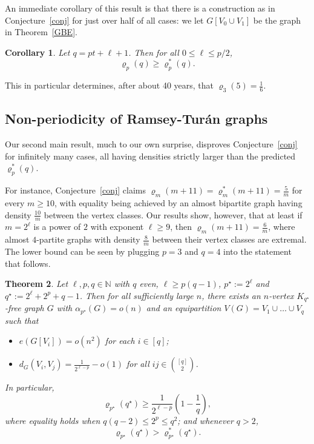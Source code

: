 \documentclass[10pt,a4paper]{article}
\newtheorem{theorem}{Theorem}[section]
\newtheorem{corollary}[theorem]{Corollary}
\theoremstyle{definition}
\begin{document}
An immediate corollary of this result is that there is a construction as in Conjecture~\ref{conj} for just over half of all cases: we let $G[V_0 \cup V_1]$ be the graph in Theorem~\ref{GBE}.


\begin{corollary}\label{cor}
	Let $q = pt+\ell+1$. Then for all $0 \leq \ell \leq p/2$, 
	$$\varrho_p(q) \geq \varrho_p^*(q).$$
\end{corollary}

This in particular determines, after about 40 years, that $\varrho_3(5)=\frac{1}{6}$.

\subsection{Non-periodicity of Ramsey-Tur\'an graphs}
Our second main result, much to our own surprise, disproves Conjecture~\ref{conj} for infinitely many cases, all having densities strictly larger than the predicted $\varrho_p^*(q)$. 

For instance, Conjecture~\ref{conj} claims $\varrho_m(m+11)=\varrho_m^*(m+11)=\frac{5}{m}$
for every $m \geq 10$, with equality being achieved by an almost bipartite graph having density $\frac{10}{m}$ between the vertex classes. Our results show, however, that at least if $m=2^\ell$ is a power of $2$ with exponent $\ell \geq 9$, then $\varrho_m(m+11)=\frac{6}{m}$, where almost $4$-partite graphs with density $\frac{8}{m}$ between their vertex classes are extremal. The lower bound can be seen by plugging $p=3$ and $q=4$ into the statement that follows.


\begin{theorem}\label{thm-2tri-exact}
	Let $\ell,p,q\in\mathbb{N}$ with $q$ even, $\ell \geq p(q-1)$, $p^{\star}:=2^\ell$ and $q^{\star}:=2^\ell+2^p+q-1$. Then for all sufficiently large $n$, there exists an $n$-vertex $K_{q^{\star}}$-free graph $G$ with $\alpha_{p^{\star}}(G)=o(n)$ and an  equipartition $V(G)=V_1\cup\ldots\cup V_q$ such that
	\begin{itemize}
		\item $e(G[V_i])=o(n^2)$ for each $i\in[q]$;
		
		\item $d_G(V_i,V_j)=\frac{1}{2^{\ell-p}}-o(1)$ for all $ij\in{[q]\choose 2}$.
	\end{itemize}
	In particular, 
	\begin{equation}\label{eq:multi-lower}
		\varrho_{p^{\star}}(q^{\star})\ge\frac{1}{2^{\ell-p}}\left(1-\frac{1}{q}\right),
	\end{equation}
	where equality holds when $q(q-2)\le 2^p\le q^2$; and whenever $q > 2$, $$\varrho_{p^{\star}}(q^{\star}) > \varrho_{p^{\star}}^*(q^{\star}).$$
\end{theorem}
\end{document}
